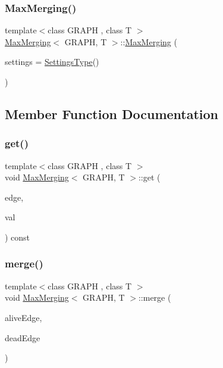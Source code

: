 \subsubsection{\texorpdfstring{Max\+Merging()}{MaxMerging()}}
{\footnotesize\ttfamily template$<$class G\+R\+A\+PH , class T $>$ \\
\hyperlink{classMaxMerging}{Max\+Merging}$<$ G\+R\+A\+PH, T $>$\+::\hyperlink{classMaxMerging}{Max\+Merging} (\begin{DoxyParamCaption}\item[{const \hyperlink{classMaxMerging_aad2aed1692a3d6d3a0f2e940ea2907d8}{Settings\+Type} \&}]{settings = {\ttfamily \hyperlink{classMaxMerging_aad2aed1692a3d6d3a0f2e940ea2907d8}{Settings\+Type}()} }\end{DoxyParamCaption})\hspace{0.3cm}{\ttfamily [inline]}}



\subsection{Member Function Documentation}
\mbox{\label{classMaxMerging_a307dbd439254d6a7cef38c8d70e371f1}} 
\subsubsection{\texorpdfstring{get()}{get()}}
{\footnotesize\ttfamily template$<$class G\+R\+A\+PH , class T $>$ \\
void \hyperlink{classMaxMerging}{Max\+Merging}$<$ G\+R\+A\+PH, T $>$\+::get (\begin{DoxyParamCaption}\item[{const uint64\+\_\+t}]{edge,  }\item[{const T}]{val }\end{DoxyParamCaption}) const\hspace{0.3cm}{\ttfamily [inline]}}

\mbox{\label{classMaxMerging_ae6d472cc2dd8b0e5023c0fbce514c87f}} 
\subsubsection{\texorpdfstring{merge()}{merge()}}
{\footnotesize\ttfamily template$<$class G\+R\+A\+PH , class T $>$ \\
void \hyperlink{classMaxMerging}{Max\+Merging}$<$ G\+R\+A\+PH, T $>$\+::merge (\begin{DoxyParamCaption}\item[{const uint64\+\_\+t}]{alive\+Edge,  }\item[{const uint64\+\_\+t}]{dead\+Edge }\end{DoxyParamCaption})\hspace{0.3cm}{\ttfamily [inline]}}

